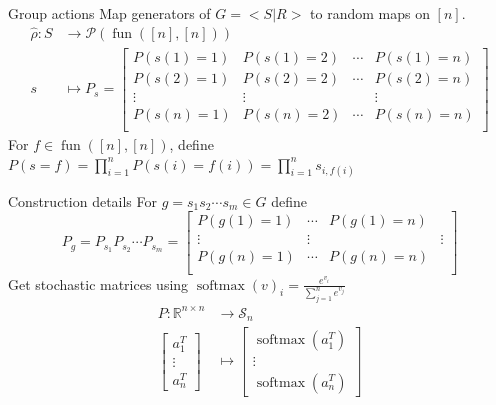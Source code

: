 \documentclass[14pt,aspectratio=169]{beamer}
\begin{document}
\begin{frame}{\color{aoblue} Group actions}
  Map generators of $G=<S|R>$ to random maps on $[n]$.
    \begin{align*}
        \hat \rho \colon S &\to \mathcal{P}(\operatorname{fun}([n],[n])) \\
    s &\mapsto P_s = \begin{bmatrix}
        P(s(1) = 1) & P(s(1) = 2) & \dotsm & P(s(1) = n) \\
        P(s(2) = 1) & P(s(2) = 2) & \dotsm & P(s(2) = n) \\
        \vdots & \vdots & & \vdots \\
        P(s(n) = 1) & P(s(n) = 2) & \dotsm & P(s(n) = n) \\
    \end{bmatrix}
    \end{align*}
    For $f \in \operatorname{fun}([n],[n])$, define $P(s = f) = \prod \limits_{i=1}^n P(s(i) = f(i)) = \prod \limits_{i=1}^n s_{i, f(i)}$
\end{frame}
\begin{frame}{Construction details}
    For $g=s_1s_2\dotsm s_m \in G$ define 
    $$P_g = P_{s_1} P_{s_2} \dotsm P_{s_m} = \begin{bmatrix}
          P(g(1) = 1) & \dotsm & P(g(1) = n) \\
        \vdots & \vdots & & \vdots \\
        P(g(n) = 1) & \dotsm & P(g(n) = n) \\
    \end{bmatrix}$$ 
    Get stochastic matrices using $\operatorname{softmax}(v)_i = \frac{e^{v_i}}{\sum_{j=1}^n e^{v_j}}$
    \begin{align*}
        P \colon \mathbb{R}^{n \times n} & \to \mathcal{S}_n \\
        \begin{bmatrix}
            a_1^T \\
            \vdots \\
            a_n^T
        \end{bmatrix} &\mapsto 
        \begin{bmatrix}
            \operatorname{softmax}(a_1^T) \\
            \vdots \\
            \operatorname{softmax}(a_n^T)
        \end{bmatrix} 
    \end{align*}
\end{frame}
\end{document}
